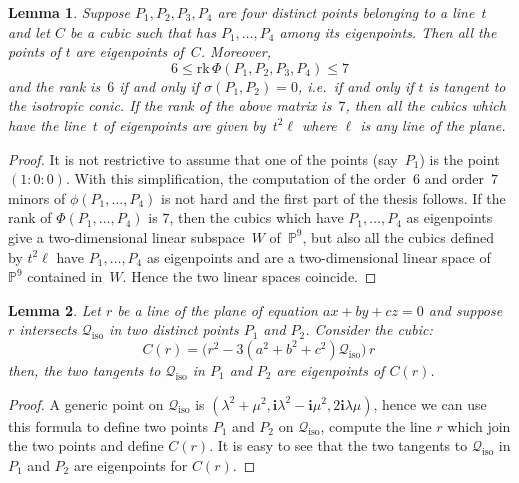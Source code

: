 \documentclass{amsart}
\theoremstyle{plain}
\newtheorem{lemma}{Lemma}[section]
\theoremstyle{definition}
\newcommand{\p}{\mathbb{P}}
\newcommand{\iso}{\mathcal{Q}_{\mathrm{iso}}}
\newcommand{\iii}{\textbf{i}}
\newcommand{\rk}{\ensuremath{\mathrm{rk}}}
\begin{document}
\begin{lemma}
\label{4ptiSuRetta2}
Suppose $P_1, P_2, P_3, P_4$ are four distinct points belonging to a line~$t$
and let $C$ be a cubic such that has $P_1, \dots, P_4$ among its eigenpoints.
Then all the points of $t$ are eigenpoints of~$C$.
Moreover,
%
\begin{equation*}
  6 \leq \rk \,\Phi(P_1, P_2, P_3, P_4) \leq 7
\end{equation*}
%
and the rank is~$6$ if and only if $\sigma(P_1, P_2) = 0$, i.e.\ if
and only if $t$ is tangent to the isotropic conic. If the rank of
the above matrix is~$7$, then all the cubics which have the line~$t$
of eigenpoints are given by~$t^2 \ell$ where $\ell$ is any line of the plane.
\end{lemma}
\begin{proof}
It is not restrictive to assume that one of the points (say~$P_1$) is
the point~$(1: 0: 0)$.
With this simplification, the computation of the order~$6$ and order~$7$
minors of $\phi(P_1, \dots, P_4)$ is not hard and
the first part of the thesis follows. If the rank of $\Phi(P_1, \dots, P_4)$
is $7$, then the cubics which have $P_1, \dots, P_4$ as eigenpoints
give a two-dimensional linear subspace~$W$ of~$\p^9$, but also all
the cubics defined by $t^2 \ell$ have $P_1, \dots, P_4$ as eigenpoints and are
a two-dimensional linear space of~$\p^9$ contained in~$W$. Hence the two linear
spaces coincide.
\end{proof}

\begin{lemma}
\label{lemma: twoTangentsCiso} Let $r$ be a line of the plane of
equation $ax+by+cz=0$ and suppose $r$ intersects $\iso$ in two distinct points $P_1$ and $P_2$. Consider the cubic:
\begin{equation}
\label{2_lines_of_eigenpoints}
  C(r) = \bigl( r^2-3\left(a^2+b^2+c^2\right)\iso \bigr) \, r \,
\end{equation}
then, the two tangents to $\iso$ in $P_1$ and $P_2$ are eigenpoints of 
$C(r)$.
\end{lemma}
\begin{proof}
A generic point on $\iso$ is $(\lambda^2 + \mu^2, 
\iii\lambda^2 -\iii\mu^2, 2\iii\lambda \mu)$, hence we can use this
formula to define two points $P_1$ and $P_2$ on $\iso$, compute the 
line $r$ which join the two points and define $C(r)$. It is easy to 
see that the two tangents to $\iso$ in $P_1$ and $P_2$ are eigenpoints
for $C(r)$.
\end{proof}
\end{document}

